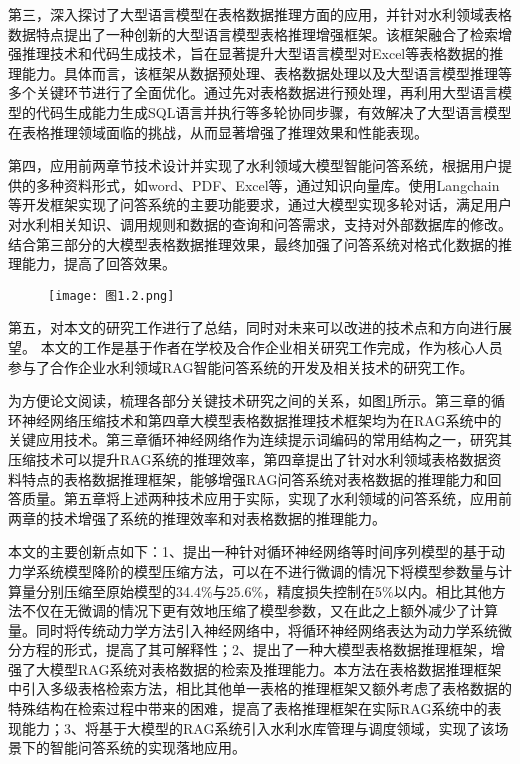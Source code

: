 第三，深入探讨了大型语言模型在表格数据推理方面的应用，并针对水利领域表格数据特点提出了一种创新的大型语言模型表格推理增强框架。该框架融合了检索增强推理技术和代码生成技术，旨在显著提升大型语言模型对Excel等表格数据的推理能力。具体而言，该框架从数据预处理、表格数据处理以及大型语言模型推理等多个关键环节进行了全面优化。通过先对表格数据进行预处理，再利用大型语言模型的代码生成能力生成SQL语言并执行等多轮协同步骤，有效解决了大型语言模型在表格推理领域面临的挑战，从而显著增强了推理效果和性能表现。

第四，应用前两章节技术设计并实现了水利领域大模型智能问答系统，根据用户提供的多种资料形式，如word、PDF、Excel等，通过知识向量库。使用Langchain等开发框架实现了问答系统的主要功能要求，通过大模型实现多轮对话，满足用户对水利相关知识、调用规则和数据的查询和问答需求，支持对外部数据库的修改。结合第三部分的大模型表格数据推理效果，最终加强了问答系统对格式化数据的推理能力，提高了回答效果。
\begin{figure}[!h]
  \centering
  \texttt{[image: 图1.2.png]}
  \label{fig:章节架构}
\end{figure}

第五，对本文的研究工作进行了总结，同时对未来可以改进的技术点和方向进行展望。
本文的工作是基于作者在学校及合作企业相关研究工作完成，作为核心人员参与了合作企业水利领域RAG智能问答系统的开发及相关技术的研究工作。

为方便论文阅读，梳理各部分关键技术研究之间的关系，如图\ref{fig:章节架构}所示。第三章的循环神经网络压缩技术和第四章大模型表格数据推理技术框架均为在RAG系统中的关键应用技术。第三章循环神经网络作为连续提示词编码的常用结构之一，研究其压缩技术可以提升RAG系统的推理效率，第四章提出了针对水利领域表格数据资料特点的表格数据推理框架，能够增强RAG问答系统对表格数据的推理能力和回答质量。第五章将上述两种技术应用于实际，实现了水利领域的问答系统，应用前两章的技术增强了系统的推理效率和对表格数据的推理能力。

本文的主要创新点如下：1、提出一种针对循环神经网络等时间序列模型的基于动力学系统模型降阶的模型压缩方法，可以在不进行微调的情况下将模型参数量与计算量分别压缩至原始模型的34.4\%与25.6\%，精度损失控制在5\%以内。相比其他方法不仅在无微调的情况下更有效地压缩了模型参数，又在此之上额外减少了计算量。同时将传统动力学方法引入神经网络中，将循环神经网络表达为动力学系统微分方程的形式，提高了其可解释性；2、提出了一种大模型表格数据推理框架，增强了大模型RAG系统对表格数据的检索及推理能力。本方法在表格数据推理框架中引入多级表格检索方法，相比其他单一表格的推理框架又额外考虑了表格数据的特殊结构在检索过程中带来的困难，提高了表格推理框架在实际RAG系统中的表现能力；3、将基于大模型的RAG系统引入水利水库管理与调度领域，实现了该场景下的智能问答系统的实现落地应用。
\label{sec:first}












